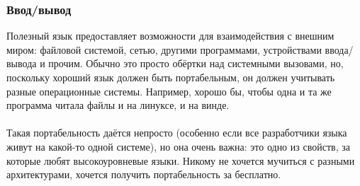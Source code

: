 \documentclass[11pt]{book}
\begin{document}
\subsubsection{Ввод/вывод}
Полезный язык предоставляет возможности для взаимодействия с внешним миром:
файловой системой, сетью, другими программами, устройствами ввода/вывода и прочим.
Обычно это просто обёртки над системными вызовами, но, поскольку хороший язык должен быть портабельным,
он должен учитывать разные операционные системы.
Например, хорошо бы, чтобы одна и та же программа читала файлы и на линуксе, и на винде.
\\ \\
Такая портабельность даётся непросто (особенно если все разработчики языка живут на какой-то одной системе),
но она очень важна: это одно из свойств, за которые любят высокоуровневые языки.
Никому не хочется мучиться с разными архитектурами, хочется получить портабельность за бесплатно.
\end{document}
